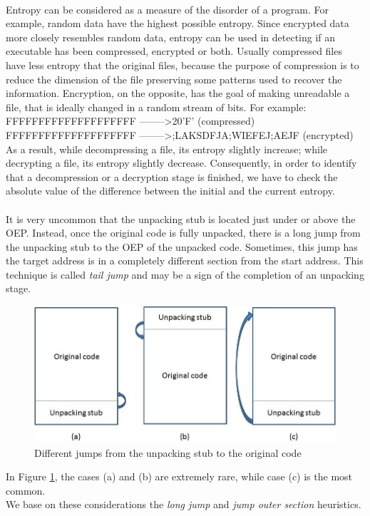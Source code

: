 \paragraph{}
Entropy can be considered as a measure of the disorder of a program. For example, random data have the highest possible entropy. Since encrypted data more closely resembles random data, entropy can be used in detecting if an executable has been compressed, encrypted or both. Usually compressed files have less entropy that the original files, because the purpose of compression is to reduce the dimension of the file preserving some patterns used to recover the information. Encryption, on the opposite, has the goal of making unreadable a file, that is ideally changed in a random stream of bits. For example:\\
FFFFFFFFFFFFFFFFFFFF --------\textgreater 20'F' (compressed)\\
FFFFFFFFFFFFFFFFFFFF --------\textgreater ;LAKSDFJA;WIEFEJ;AEJF (encrypted)\\
As a result, while decompressing a file, its entropy slightly increase; while decrypting a file, its entropy slightly decrease. Consequently, in order to identify that a decompression or a decryption stage is finished, we have to check the absolute value of the difference between the initial and the current entropy.
\paragraph{}
It is very uncommon that the unpacking stub is located just under or above the \ac{OEP}. Instead, once the original code is fully unpacked, there is a long jump from the unpacking stub to the \ac{OEP} of the unpacked code. Sometimes, this jump has the target address is in a completely different section from the start address. This technique is called \textit{tail jump} and may be a sign of the completion of an unpacking stage. 
\begin{figure}[!ht]
	\begin{center}
   		\includegraphics [width=\textwidth]{./pictures/Original Code And Unpacking Stub.jpg}
	\end{center}
	\caption{Different jumps from the unpacking stub to the original code}
	\label{Original Code And Unpacking Stub}
\end{figure}
In Figure \ref{Original Code And Unpacking Stub}, the cases (a) and (b) are extremely rare, while case (c) is the most common.\\
We base on these considerations the \textit{long jump} and \textit{jump outer section} heuristics.
